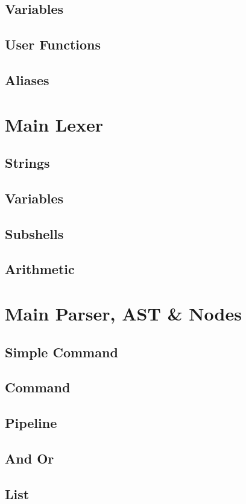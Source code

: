 \subsection{Variables}
\subsection{User Functions}
\subsection{Aliases}

\section{Main Lexer}

\subsection{Strings}
\subsection{Variables}
\subsection{Subshells}
\subsection{Arithmetic}

\section{Main Parser, AST \& Nodes}

\subsection{Simple Command}
\subsection{Command}
\subsection{Pipeline}
\subsection{And Or}
\subsection{List}

